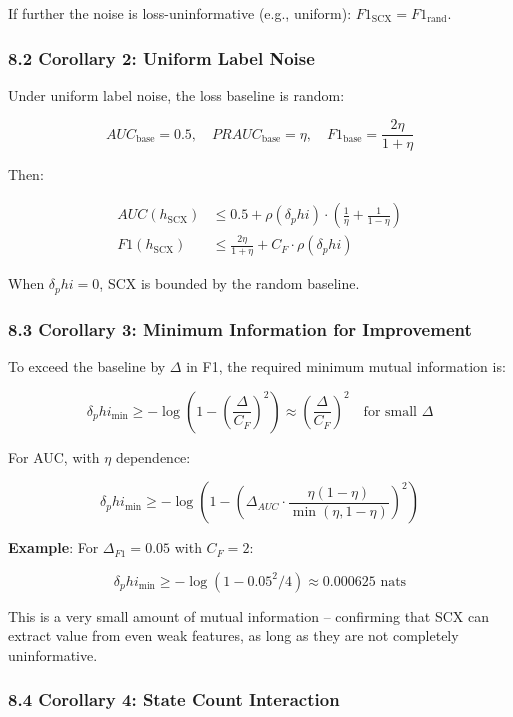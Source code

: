 \documentclass[
  12pt,
]{ctexart}
\begin{document}
If further the noise is loss-uninformative (e.g., uniform):
\(F1_{\text{SCX}} = F1_{\text{rand}}\).

\subsubsection{8.2 Corollary 2: Uniform Label
Noise}\label{corollary-2-uniform-label-noise}

Under uniform label noise, the loss baseline is random:

\[AUC_{\text{base}} = 0.5, \quad PRAUC_{\text{base}} = \eta, \quad F1_{\text{base}} = \frac{2\eta}{1+\eta}\]

Then:

\[\begin{aligned}
AUC(h_{\text{SCX}}) &\leq 0.5 + \rho(\delta_phi) \cdot \left(\frac{1}{\eta} + \frac{1}{1-\eta}\right) \\
F1(h_{\text{SCX}}) &\leq \frac{2\eta}{1+\eta} + C_F \cdot \rho(\delta_phi)
\end{aligned}\]

When \(\delta_phi = 0\), SCX is bounded by the random baseline.

\subsubsection{8.3 Corollary 3: Minimum Information for
Improvement}\label{corollary-3-minimum-information-for-improvement}

To exceed the baseline by \(\Delta\) in F1, the required minimum mutual
information is:

\[\delta_phi_{\min} \geq -\log\!\left(1 - \left(\frac{\Delta}{C_F}\right)^2\right) \approx \left(\frac{\Delta}{C_F}\right)^2 \quad \text{for small } \Delta\]

For AUC, with \(\eta\) dependence:

\[\delta_phi_{\min} \geq -\log\!\left(1 - \left(\Delta_{AUC} \cdot \frac{\eta(1-\eta)}{\min(\eta, 1-\eta)}\right)^2\right)\]

\textbf{Example}: For \(\Delta_{F1} = 0.05\) with \(C_F = 2\):

\[\delta_phi_{\min} \geq -\log(1 - 0.05^2/4) \approx 0.000625 \text{ nats}\]

This is a very small amount of mutual information -- confirming that SCX
can extract value from even weak features, as long as they are not
completely uninformative.

\subsubsection{8.4 Corollary 4: State Count
Interaction}\label{corollary-4-state-count-interaction}
\end{document}
